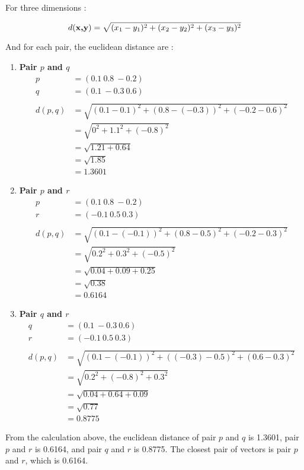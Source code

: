 \documentclass[12pt]{article}%
\begin{document}
\begin{enumerate}
\begin{enumerate}
		\par For three dimensions : 

		\begin{equation}
			d(\textbf{\textup{x,y}}) = \sqrt{(x_1-y_1)^2 + (x_2-y_2)^2 + (x_3-y_3)^2}
		\end{equation}

		\par And for each pair, the euclidean distance are :

		\begin{enumerate}
			\item \textbf{Pair $p$ and $q$}
			\begin{align*}
			 	 p & = (0.1 \ 0.8 \ -0.2) \\ 
				 q & = (0.1 \ -0.3 \ 0.6) \\ 
				 \\
				 d(p,q) & = \sqrt{(0.1-0.1)^2 + (0.8-(-0.3))^2 + (-0.2-0.6)^2} \\
				 & = \sqrt{0^2 + 1.1^2 + (-0.8)^2} \\
				 & = \sqrt{1.21 + 0.64} \\
				 & = \sqrt{1.85} \\
				 & = 1.3601
			\end{align*}

			\item \textbf{Pair $p$ and $r$}
			\begin{align*}
			 	 p & = (0.1 \ 0.8 \ -0.2) \\ 
				 r & = (-0.1 \ 0.5 \ 0.3) \\ 
				 \\
				 d(p,q) & = \sqrt{(0.1-(-0.1))^2 + (0.8-0.5)^2 + (-0.2-0.3)^2} \\
				 & = \sqrt{0.2^2 + 0.3^2 + (-0.5)^2} \\
				 & = \sqrt{0.04 + 0.09 + 0.25} \\
				 & = \sqrt{0.38} \\
				 & = 0.6164
			\end{align*}

			\item \textbf{Pair $q$ and $r$}
			\begin{align*}
			 	 q & = (0.1 \ -0.3 \ 0.6) \\ 
				 r & = (-0.1 \ 0.5 \ 0.3) \\ 
				 \\
				 d(p,q) & = \sqrt{(0.1-(-0.1))^2 + ((-0.3)-0.5)^2 + (0.6-0.3)^2} \\
				 & = \sqrt{0.2^2 + (-0.8)^2 + 0.3^2} \\
				 & = \sqrt{0.04 + 0.64 + 0.09} \\
				 & = \sqrt{0.77} \\
				 & = 0.8775
			\end{align*}
		\end{enumerate}

		\par From the calculation above, the euclidean distance of pair $p$ and $q$ is 1.3601, pair $p$ and $r$ is 0.6164, and pair $q$ and $r$ is 0.8775. The closest pair of vectors is pair $p$ and $r$, which is 0.6164.
	\end{enumerate}

\end{enumerate}
\end{document}
